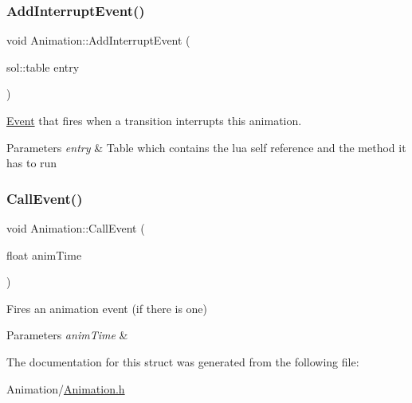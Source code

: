 \subsubsection{\texorpdfstring{Add\+Interrupt\+Event()}{AddInterruptEvent()}}
{\footnotesize\ttfamily void Animation\+::\+Add\+Interrupt\+Event (\begin{DoxyParamCaption}\item[{sol\+::table}]{entry }\end{DoxyParamCaption})\hspace{0.3cm}{\ttfamily [inline]}}



\hyperlink{classEvent}{Event} that fires when a transition interrupts this animation. 


\begin{DoxyParams}{Parameters}
{\em entry} & Table which contains the lua self reference and the method it has to run \\
\hline
\end{DoxyParams}
\mbox{\label{structAnimation_a4bfa0e66492903e4435233193ad4979a}} 
\subsubsection{\texorpdfstring{Call\+Event()}{CallEvent()}}
{\footnotesize\ttfamily void Animation\+::\+Call\+Event (\begin{DoxyParamCaption}\item[{float}]{anim\+Time }\end{DoxyParamCaption})\hspace{0.3cm}{\ttfamily [inline]}}



Fires an animation event (if there is one) 


\begin{DoxyParams}{Parameters}
{\em anim\+Time} & \\
\hline
\end{DoxyParams}


The documentation for this struct was generated from the following file\+:\begin{DoxyCompactItemize}
\item 
Animation/\hyperlink{Animation_8h}{Animation.\+h}\end{DoxyCompactItemize}
